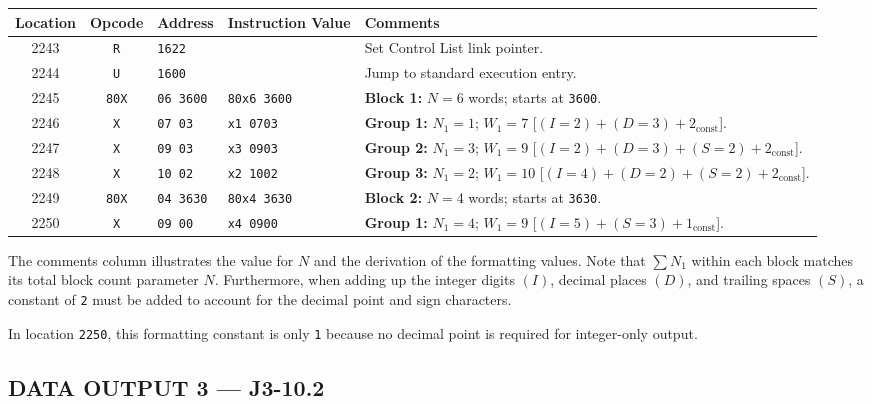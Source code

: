 \begin{center}
\small
\begin{tabularx}{\textwidth}{ccllX}
    \toprule
    \textbf{Location} & \textbf{Opcode} & \textbf{Address} & \textbf{Instruction Value} & \textbf{Comments} \\
    \midrule
    2243 & \texttt{R}   & \texttt{1622}    &                       & Set Control List link pointer. \\
    2244 & \texttt{U}   & \texttt{1600}    &                       & Jump to standard execution entry. \\
    2245 & \texttt{80X} & \texttt{06 3600} & \texttt{80x6 3600}    & \textbf{Block 1:} $N=6$ words; starts at \texttt{3600}. \\
    2246 & \texttt{X}   & \texttt{07 03}   & \texttt{x1 0703}      & \textbf{Group 1:} $N_1=1$; $W_1=7$ [$(I=2)+(D=3)+2_{\text{const}}$]. \\
    2247 & \texttt{X}   & \texttt{09 03}   & \texttt{x3 0903}      & \textbf{Group 2:} $N_1=3$; $W_1=9$ [$(I=2)+(D=3)+(S=2)+2_{\text{const}}$]. \\
    2248 & \texttt{X}   & \texttt{10 02}   & \texttt{x2 1002}      & \textbf{Group 3:} $N_1=2$; $W_1=10$ [$(I=4)+(D=2)+(S=2)+2_{\text{const}}$]. \\
    2249 & \texttt{80X} & \texttt{04 3630} & \texttt{80x4 3630}    & \textbf{Block 2:} $N=4$ words; starts at \texttt{3630}. \\
    2250 & \texttt{X}   & \texttt{09 00}   & \texttt{x4 0900}      & \textbf{Group 1:} $N_1=4$; $W_1=9$ [$(I=5)+(S=3)+1_{\text{const}}$]. \\
    \bottomrule
\end{tabularx}
\end{center}

The comments column illustrates the value for $N$ and the derivation of the formatting values. Note that $\sum N_1$ within each block matches its total block count parameter $N$. Furthermore, when adding up the integer digits $(I)$, decimal places $(D)$, and trailing spaces $(S)$, a constant of \texttt{2} must be added to account for the decimal point and sign characters. 

In location \texttt{2250}, this formatting constant is only \texttt{1} because no decimal point is required for integer-only output.
\newpage
\subsection*{DATA OUTPUT 3 --- J3-10.2}
\label{sec:data-output-3}

